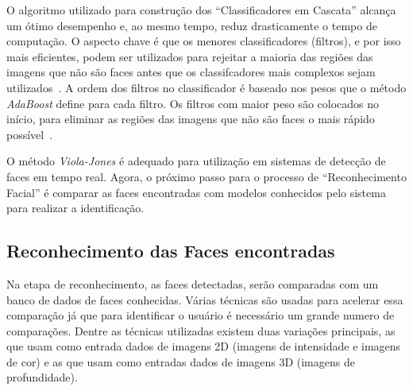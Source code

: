 O algoritmo utilizado para construção dos ``Classificadores em Cascata'' alcança um ótimo desempenho e, ao mesmo tempo, reduz drasticamente o tempo de computação. O aspecto chave é que os menores classificadores (filtros), e por isso mais eficientes, podem ser utilizados para rejeitar a maioria das regiões das imagens que não são faces antes que os classifcadores mais complexos sejam utilizados~\cite{violajones}. A ordem dos filtros no classificador é baseado nos pesos que o método \textit{AdaBoost} define para cada filtro. Os filtros com maior peso são colocados no início, para eliminar as regiões das imagens que não são faces o mais rápido possível~\cite{servodetection}. 

O método \textit{Viola-Jones} é adequado para utilização em sistemas de detecção de faces em tempo real. Agora, o próximo passo para o processo de ``Reconhecimento Facial'' é comparar as faces encontradas com modelos conhecidos pelo sistema para realizar a identificação.


\subsection{Reconhecimento das Faces encontradas}

Na etapa de reconhecimento, as faces detectadas, serão comparadas com um banco de dados de faces conhecidas. Várias técnicas são usadas para acelerar essa comparação já que para identificar o usuário é necessário um grande numero de comparações. Dentre as técnicas utilizadas existem duas variações principais, as que usam como entrada dados de imagens 2D (imagens de intensidade e imagens de cor) e as que usam como entradas dados de imagens 3D (imagens de profundidade).

